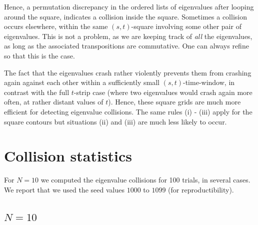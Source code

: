 \documentclass{article}
\begin{document}
	Hence, a permutation discrepancy in the ordered lists of eigenvalues
	after looping around the square, indicates a collision inside the square.
	Sometimes a collision occurs elsewhere, within the same $(s,t)$-square involving 
	some other pair of eigenvalues.
	This is not a problem, as we are keeping track of \emph{all} the eigenvalues, 
	as long as the associated transpositions are commutative.
	One can always refine so that this is the case.

	The fact that the eigenvalues crash rather violently prevents them from crashing again 
	against each other within a 
	sufficiently small $(s,t)$-time-window, in contrast with the full $t$-strip case (where two eigenvalues 
	would crash again more often, at rather distant values of $t$). 
	Hence, these square grids are much more efficient 
	for detecting eigenvalue collisions. The same rules (i) - (iii) 
	apply for the square contours  
	but situations (ii) and (iii) are much less likely to occur.
	
	\section{Collision statistics} \label{section:collision-statistics}

	For $N=10$ we computed the eigenvalue collisions for 100 trials, in several cases.
	We report that we used the seed values $1000$ to $1099$ (for reproductibility).

	\subsection {$N=10$}
\end{document}
